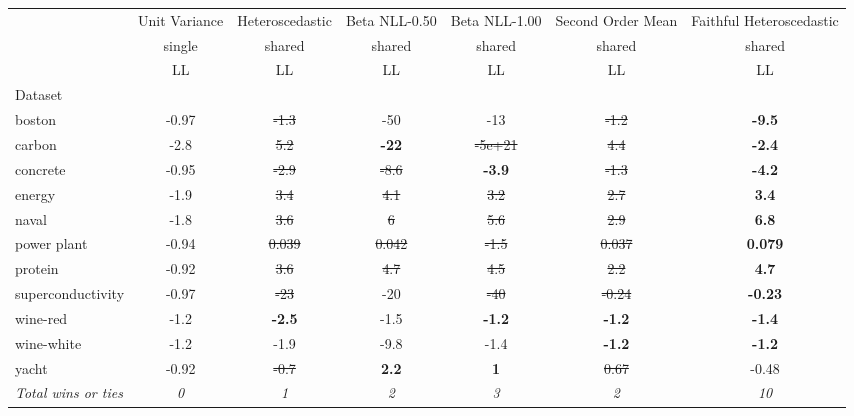 \begin{tabular}{l|c|c|c|c|c|c}
\toprule
{} & {Unit Variance} & {Heteroscedastic} & {Beta NLL-0.50} & {Beta NLL-1.00} & {Second Order Mean} & {Faithful Heteroscedastic} \\
{} & {single} & {shared} & {shared} & {shared} & {shared} & {shared} \\
{} & {LL} & {LL} & {LL} & {LL} & {LL} & {LL} \\
{Dataset} & {} & {} & {} & {} & {} & {} \\
\midrule
boston & -0.97 & \sout{-1.3} & -50 & -13 & \sout{-1.2} & \textbf{-9.5} \\
carbon & -2.8 & \sout{5.2} & \textbf{-22} & \sout{-5e+21} & \sout{4.4} & \textbf{-2.4} \\
concrete & -0.95 & \sout{-2.9} & \sout{-8.6} & \textbf{-3.9} & \sout{-1.3} & \textbf{-4.2} \\
energy & -1.9 & \sout{3.4} & \sout{4.1} & \sout{3.2} & \sout{2.7} & \textbf{3.4} \\
naval & -1.8 & \sout{3.6} & \sout{6} & \sout{5.6} & \sout{2.9} & \textbf{6.8} \\
power plant & -0.94 & \sout{0.039} & \sout{0.042} & \sout{-1.5} & \sout{0.037} & \textbf{0.079} \\
protein & -0.92 & \sout{3.6} & \sout{4.7} & \sout{4.5} & \sout{2.2} & \textbf{4.7} \\
superconductivity & -0.97 & \sout{-23} & -20 & \sout{-40} & \sout{-0.24} & \textbf{-0.23} \\
wine-red & -1.2 & \textbf{-2.5} & -1.5 & \textbf{-1.2} & \textbf{-1.2} & \textbf{-1.4} \\
wine-white & -1.2 & -1.9 & -9.8 & -1.4 & \textbf{-1.2} & \textbf{-1.2} \\
yacht & -0.92 & \sout{-0.7} & \textbf{2.2} & \textbf{1} & \sout{0.67} & -0.48 \\
\textit{{Total wins or ties}} & \textit{0} & \textit{1} & \textit{2} & \textit{3} & \textit{2} & \textit{10} \\
\bottomrule
\end{tabular}
